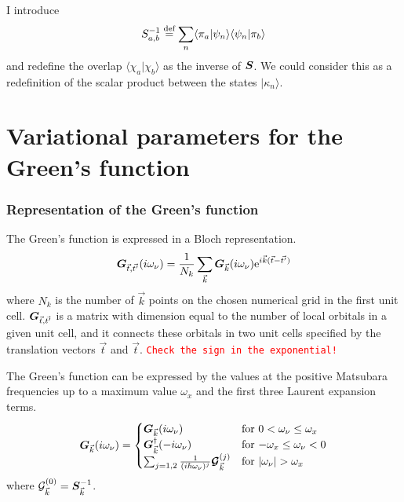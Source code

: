\documentclass[11pt,a4paper]{report}
\newcommand{\petertt}[1]{\textcolor{red}{\texttt{#1}}}
\begin{document}
I introduce
\begin{eqnarray}
S^{-1}_{a,b}\stackrel{\text{def}}{=} \sum_{n}\langle\pi_a|\psi_n\rangle\langle\psi_n|\pi_b\rangle
\label{eq:defoverlapmatrix}
\end{eqnarray}
and redefine the overlap $\langle\chi_a|\chi_b\rangle$ as the inverse
of $\bm{S}$. We could consider this as a redefinition of the scalar
product between the states $|\kappa_n\rangle$.







\section{Variational parameters for the Green's function}
\subsubsection{Representation of the Green's function}
The Green's function is expressed in a Bloch representation.
\begin{eqnarray}
\bm{G}_{\vec{t},\vec{t'}}(i\omega_\nu)=\frac{1}{N_k}\sum_{\vec{k}}
\bm{G}_{\vec{k}}(i\omega_\nu)\mathrm{e}^{i\vec{k}(\vec{t}-\vec{t'})}
\end{eqnarray}
where $N_k$ is the number of $\vec{k}$ points on the chosen numerical
grid in the first unit cell.  $\bm{G}_{\vec{t},\vec{t'}}$ is a matrix
with dimension equal to the number of local orbitals in a given unit
cell, and it connects these orbitals in two unit cells specified by
the translation vectors $\vec{t}$ and $\vec{t}$.  \petertt{Check the
  sign in the exponential!}


The Green's function can be expressed by the values at the positive
Matsubara frequencies up to a maximum value $\omega_x$ and the first
three Laurent expansion terms.
\begin{eqnarray}
\mat{G}_{\vec{k}}(i\omega_\nu)=
\begin{cases}
\mat{G}_{\vec{k}}(i\omega_\nu)
&\text{for $0<\omega_\nu\le\omega_x$}\\
\mat{G}_{\vec{k}}^\dagger(-i\omega_\nu)
&\text{for $-\omega_x\le\omega_\nu<0$}\\
\sum_{j=1,2}\frac{1}{(i\hbar\omega_\nu)^j}
\mat{\mathcal{G}}^{(j)}_{\vec{k}}
&\text{for $|\omega_\nu|>\omega_x$}\\
\end{cases}
\label{eq:Greensfunctionrep}
\end{eqnarray}
where $\mathcal{\bm{G}}^{(0)}_{\vec{k}}=\bm{S}_{\vec{k}}^{-1}$.
\end{document}
